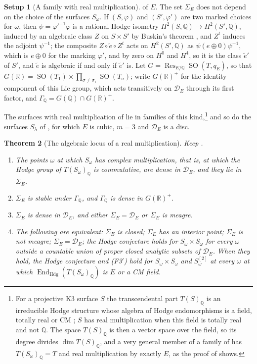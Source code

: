 \documentclass[11pt,reqno]{amsart}
\theoremstyle{plain}
\newtheorem{theorem}{Theorem}[section]
\theoremstyle{definition}
\newtheorem{setupenv}[theorem]{Setup}
\theoremstyle{remark}
\newcommand{\QQ}{\mathbb{Q}}
\newcommand{\RR}{\mathbb{R}}
\newcommand{\cD}{\mathcal{D}}
\DeclareMathOperator{\End}{End}
\DeclareMathOperator{\Res}{Res}
\DeclareMathOperator{\SO}{SO}
\begin{document}
\begin{setupenv}[A family with real multiplication]
of $E$. The set $\Sigma_{E}$ does not depend on the choice of the surfaces
$S_{\omega}$. If $(S,\varphi)$ and $(S',\varphi')$ are two marked choices
for $\omega$, then $\psi=\varphi'^{-1}\varphi$ is a rational Hodge isometry
$H^{2}(S,\QQ)\to H^{2}(S',\QQ)$, induced by an algebraic class $Z$ on
$S\times S'$ by Buskin's theorem \cite{Bus19}, and $Z^{t}$ induces the
adjoint $\psi^{-1}$; the composite $Z\circ\tilde e\circ Z^{t}$ acts on
$H^{2}(S',\QQ)$ as $\psi(e\oplus0)\psi^{-1}$, which is $e\oplus0$ for the
marking $\varphi'$, and by zero on $H^{0}$ and $H^{4}$, so it is the class
$\tilde e'$ of $S'$, and $\tilde e$ is algebraic if and only if $\tilde e'$
is. Let $G=\Res_{E/\QQ}\SO(T,q_{E})$, so that
$G(\RR)=\SO(T_{1})\times\prod_{\sigma\ne\sigma_{1}}\SO(T_{\sigma})$; write
$G(\RR)^{+}$ for the identity component of this Lie group, which acts
transitively on $\cD_{E}$ through its first factor, and
$\Gamma_{\QQ}=G(\QQ)\cap G(\RR)^{+}$.
\end{setupenv}

The surfaces with real multiplication of \cite{vG08,vGS25} lie in families
of this kind,\footnote{For a projective K3 surface $S$ the transcendental
part $T(S)_{\QQ}$ is an irreducible Hodge structure whose algebra of Hodge
endomorphisms is a field, totally real or CM \cite{Zar83}; $S$ has real
multiplication when this field is totally real and not $\QQ$. The space
$T(S)_{\QQ}$ is then a vector space over the field, so its degree divides
$\dim T(S)_{\QQ}$, and a very general member of a family of
 has $T(S_{\omega})_{\QQ}=T$ and real multiplication by
exactly $E$, as the proof of  shows.} and so do the surfaces $S_{\lambda}$ of ,
for which $E$ is cubic, $m=3$ and $\cD_{E}$ is a disc.

\begin{theorem}[The algebraic locus of a real multiplication]
\label{thm:rmlocus}
Keep .
\begin{enumerate}[label=\textup{(\roman*)},leftmargin=2.6em,itemsep=2pt]
\item The points $\omega$ at which $S_{\omega}$ has complex multiplication,
  that is, at which the Hodge group of $T(S_{\omega})_{\QQ}$ is commutative,
  are dense in $\cD_{E}$, and they lie in $\Sigma_{E}$.
\item $\Sigma_{E}$ is stable under $\Gamma_{\QQ}$, and $\Gamma_{\QQ}$ is dense
  in $G(\RR)^{+}$.
\item $\Sigma_{E}$ is dense in $\cD_{E}$, and either $\Sigma_{E}=\cD_{E}$ or
  $\Sigma_{E}$ is meagre.
\item The following are equivalent: $\Sigma_{E}$ is closed; $\Sigma_{E}$ has
  an interior point; $\Sigma_{E}$ is not meagre; $\Sigma_{E}=\cD_{E}$; the
  Hodge conjecture holds for $S_{\omega}\times S_{\omega}$ for every $\omega$
  outside a countable union of proper closed analytic subsets of $\cD_{E}$.
  When they hold, the Hodge conjecture and \textup{(F3$'$)} hold for
  $S_{\omega}\times S_{\omega}$ and $S_{\omega}^{[2]}$ at every $\omega$ at
  which $\End_{\mathrm{Hdg}}(T(S_{\omega})_{\QQ})$ is $E$ or a CM field.
\end{enumerate}
\end{theorem}
\end{document}
